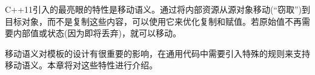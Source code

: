 C++11引入的最亮眼的特性是移动语义。通过将内部资源从源对象移动(“窃取”)到目标对象，而不是复制这些内容，可以使用它来优化复制和赋值。若原始值不再需要内部值或状态(因为即将丢弃)，就可以移动。

移动语义对模板的设计有很重要的影响，在通用代码中需要引入特殊的规则来支持移动语义。本章将对这些特性进行介绍。